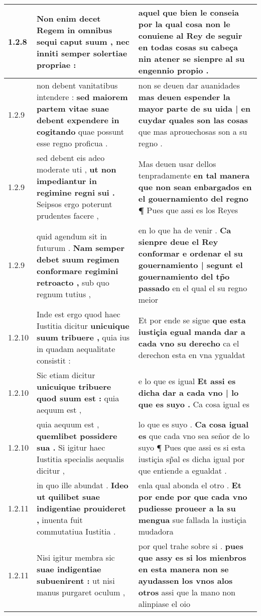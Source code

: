 \begin{tabular}{|p{1cm}|p{6.5cm}|p{6.5cm}|}
1.2.8 & Non enim decet Regem \textbf{ in omnibus sequi caput suum , } nec inniti semper solertiae propriae : & aquel que bien le conseia \textbf{ por la qual cosa non le conuiene al Rey de seguir en todas cosas su cabeça } nin atener se sienpre al su engennio propio . \\\hline
1.2.9 & non debent vanitatibus intendere : \textbf{ sed maiorem partem vitae suae debent expendere in cogitando } quae possunt esse regno proficua . & non se deuen dar auanidades \textbf{ mas deuen espender la mayor parte de su uida | en cuydar quales son las cosas } que mas aprouechosas son a su regno . \\\hline
1.2.9 & sed debent eis adeo moderate uti , \textbf{ ut non impediantur in regimine regni sui . } Seipsos ergo poterunt prudentes facere , & Mas deuen usar dellos tenpradamente \textbf{ en tal manera que non sean enbargados en el gouernamiento del regno ¶ } Pues que assi es los Reyes \\\hline
1.2.9 & quid agendum sit in futurum . \textbf{ Nam semper debet suum regimen conformare regimini retroacto , } sub quo regnum tutius , & en lo que ha de venir . \textbf{ Ca sienpre deue el Rey conformar e ordenar el su gouernamiento | segunt el gouernamiento del tp̃o passado } en el qual el su regno meior \\\hline
1.2.10 & Inde est ergo quod haec Iustitia dicitur \textbf{ unicuique suum tribuere , } quia ius in quadam aequalitate consistit : & Et por ende se sigue \textbf{ que esta iustiçia egual manda dar a cada vno su derecho } ca el derechon esta en vna ygualdat \\\hline
1.2.10 & Sic etiam dicitur \textbf{ unicuique tribuere quod suum est : } quia aequum est , & e lo que es igual \textbf{ Et assi es dicha dar a cada vno | lo que es suyo . } Ca cosa igual es \\\hline
1.2.10 & quia aequum est , \textbf{ quemlibet possidere sua . } Si igitur haec Iustitia specialis aequalis dicitur , & lo que es suyo . \textbf{ Ca cosa igual es } que cada vno sea señor de lo suyo ¶ Pues que assi es si esta iustiçia sp̃al es dicha igual por que entiende a egualdat . \\\hline
1.2.11 & in quo ille abundat . \textbf{ Ideo ut quilibet suae indigentiae prouideret , } inuenta fuit commutatiua Iustitia . & enla qual abonda el otro . \textbf{ Et por ende por que cada vno pudiesse proueer a la su mengua } sue fallada la iustiçia mudadora \\\hline
1.2.11 & Nisi igitur membra sic \textbf{ suae indigentiae subuenirent : } ut nisi manus purgaret oculum , & por quel trahe sobre si . \textbf{ pues que assy es si los mienbros en esta manera non se ayudassen los vnos alos otros } assi que la mano non alinpiase el oio \\\hline

\end{tabular}
